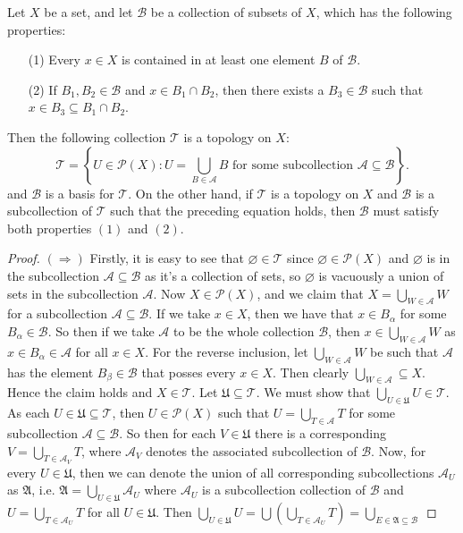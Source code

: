 \documentclass[10pt,reqno]{amsart}
\theoremstyle{definition}
\begin{document}
\begin{tcolorbox}[colback=black!5!white,colframe=black!75!black,title= Chapter 3 $\S3.2$: Exercise 3.1.]  
\begin{tcolorbox}[colback=red!5!white,colframe=red!75!red,title= Proposition 3.4.] 
Let $X$ be a set, and let $\mathcal B$ be a collection of subsets of $X$, which has the following properties: 
\begin{itemize}
	\item [(1)] Every $x \in X$ is contained in at least one element $B$ of $\mathcal B$.
	\item [(2)] If $B_1, B_2 \in \mathcal B$ and $x \in B_1 \cap B_2$, then there exists a $B_3 \in \mathcal B$ such that $x \in B_3 \subseteq B_1 \cap B_2$.
\end{itemize}
Then the following collection $\mathcal T$ is a topology on $X$: 
\[ \mathcal T = \left \{ U \in \mathcal P(X) \colon U = \bigcup _{B \in \mathcal A} B \text{ for some subcollection } \mathcal A \subseteq \mathcal B \right \}.
\]
and $\mathcal B$ is a basis for $\mathcal T$. On the other hand, if $\mathcal T$ is a topology on $X$ and $\mathcal B$ is a subcollection of $\mathcal T$ such that the preceding equation holds, then $\mathcal B$ must satisfy both properties $(1)$ and $(2)$.
\end{tcolorbox}
\begin{proof} 
$(\Rightarrow)$ Firstly, it is easy to see that $\varnothing \in \mathcal T$ since $\varnothing \in \mathcal P(X)$ and $\varnothing$ is in the subcollection $\mathcal A \subseteq \mathcal B$ as it's a collection of sets, so $\varnothing$ is vacuously a union of sets in the subcollection $\mathcal A$. Now $X \in \mathcal P(X)$, and we claim that $X = \bigcup _{W \in \mathcal A} W$ for a subcollection $\mathcal A \subseteq \mathcal B$. If we take $x \in X$, then we have that $x \in B_\alpha$ for some $B_\alpha \in \mathcal B$. So then if we take $\mathcal A$ to be the whole collection $\mathcal B$, then $x \in \bigcup _{W \in \mathcal A} W$ as $x \in B_\alpha \in \mathcal A$ for all $x \in X$. For the reverse inclusion, let $\bigcup_{W \in \mathcal A} W$ be such that $\mathcal A$ has the element $B_\beta \in \mathcal B$ that posses every $x \in X$. Then clearly $\bigcup _{W \in \mathcal A} \subseteq X$. Hence the claim holds and $X \in \mathcal T$. Let $\mathfrak U \subseteq \mathcal T$. We must show that $\bigcup_{U \in \mathfrak U} U  \in \mathcal T$. As each $U \in \mathfrak U \subseteq \mathcal T$, then $U \in \mathcal P(X)$ such that $U = \bigcup_{T \in \mathcal A} T$ for some subcollection $\mathcal A \subseteq \mathcal B$. So then for each $V \in \mathfrak U$ there is a corresponding  $V = \bigcup_{T \in \mathcal A_V} T$, where $\mathcal A_V$ denotes the associated subcollection of $\mathcal B$. Now, for every $U \in \mathfrak U$, then we can denote the union of all corresponding subcollections $\mathcal A_U$ as $\mathfrak A$, i.e. $\mathfrak A = \bigcup _{U \in \mathfrak U} \mathcal A_U$ where $\mathcal A_U$ is a subcollection collection of $\mathcal B$ and $U = \bigcup_{T \in \mathcal A_U} T$ for all $U \in \mathfrak U$. Then $ \bigcup_{U \in \mathfrak U} U = \bigcup \left(\bigcup _{T \in \mathcal A_U} T \right) = \bigcup_{E \in \mathfrak A \subseteq \mathcal B} $

\end{proof}
\end{tcolorbox}
\end{document}
